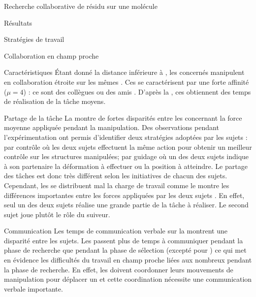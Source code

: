 \documentclass[myfrancais,ngerman,english,french]{mythesis}
\begin{document}
\begin{mychapter}{Recherche collaborative de résidu sur une molécule}
\begin{mysection}{Résultats}
\begin{mysubsection}{Stratégies de travail}
\begin{mysubsubsection}{Collaboration en champ proche}
\begin{myparagraph}{Caractéristiques}
						Étant donné la distance inférieure à , les  concernés manipulent en collaboration étroite sur les mêmes .
						Ces  se caractérisent par une forte affinité ($\mu = 4$) : ce sont des collègues ou des amis .
						D'après la , ces  obtiennent des temps de réalisation de la tâche moyens.
					\end{myparagraph}
					\begin{myparagraph}{Partage de la tâche}
						La  montre de fortes disparités entre les  concernant la force moyenne appliquée pendant la manipulation.
						Des observations pendant l'expérimentation ont permis d'identifier deux stratégies adoptées par les sujets : \og par contrôle \fg où les deux sujets effectuent la même action pour obtenir un meilleur contrôle sur les structures manipulées; \og par guidage \fg où un des deux sujets indique à son partenaire la déformation à effectuer ou la position à atteindre.
						Le partage des tâches est donc très différent selon les initiatives de chacun des sujets.
						Cependant, les  se distribuent mal la charge de travail comme le montre les différences importantes entre les forces appliquées par les deux sujets .
						En effet, seul un des deux sujets réalise une grande partie de la tâche à réaliser.
						Le second sujet joue plutôt le rôle du suiveur.
					\end{myparagraph}
					\begin{myparagraph}{Communication}
						Les temps de communication verbale sur la  montrent une disparité entre les sujets.
						Les  passent plus de temps à communiquer pendant la phase de recherche que pendant la phase de sélection (excepté pour ) ce qui met en évidence les difficultés du travail en champ proche liées aux nombreux  pendant la phase de recherche.
						En effet, les  doivent coordonner leurs mouvements de manipulation pour déplacer un  et cette coordination nécessite une communication verbale importante.

\end{myparagraph}
\end{mysubsubsection}
\end{mysubsection}
\end{mysection}
\end{mychapter}
\end{document}
